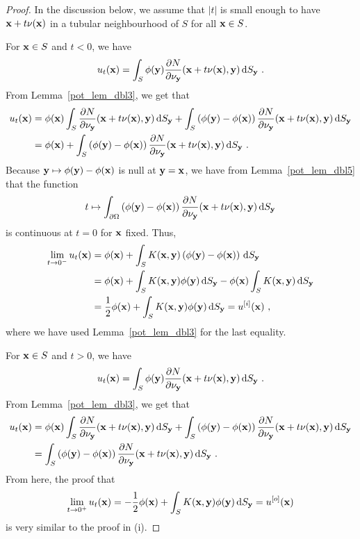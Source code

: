 \begin{proof}
In the discussion below, we assume that $|t|$ is small enough to have
$\mathbf{x} + t \mathbf{\nu}(\mathbf{x})$ in a tubular neighbourhood of $S$ for
all $\mathbf{x} \in S$.  

For $\mathbf{x} \in S$ and $t<0$, we have
\[
u_t(\mathbf{x}) = \int_S \phi(\mathbf{y})
\frac{\partial{N}}{\partial \mathbf{\nu}_{\mathbf{y}}}(\mathbf{x} +t \mathbf{\nu}(\mathbf{x}),\mathbf{y})
\,\mathrm{d}{S}_{\mathbf{y}} \ .
\]
From Lemma~\ref{pot_lem_dbl3}, we get that
\begin{align*}
u_t(\mathbf{x}) &= \phi(\mathbf{x}) \int_S \frac{\partial{N}}{\partial \mathbf{\nu}_{\mathbf{y}}}
(\mathbf{x} +t \mathbf{\nu}(\mathbf{x}),\mathbf{y}) \,\mathrm{d}{S}_{\mathbf{y}}
+ \int_S \left( \phi(\mathbf{y}) - \phi(\mathbf{x}) \right)
\frac{\partial{N}}{\partial \mathbf{\nu}_{\mathbf{y}}}(\mathbf{x} +t \mathbf{\nu}(\mathbf{x}),\mathbf{y})
\,\mathrm{d}{S}_{\mathbf{y}} \\
&= \phi(\mathbf{x}) + \int_S \left( \phi(\mathbf{y}) - \phi(\mathbf{x}) \right) 
\frac{\partial{N}}{\partial \mathbf{\nu}_{\mathbf{y}}}(\mathbf{x} +t \mathbf{\nu}(\mathbf{x}),\mathbf{y})
\,\mathrm{d}{S}_{\mathbf{y}} \ .
\end{align*}
Because $\mathbf{y} \mapsto \phi(\mathbf{y})-\phi(\mathbf{x})$ is null at
$\mathbf{y}=\mathbf{x}$, we have from Lemma~\ref{pot_lem_dbl5} that the function
\[
t \mapsto \int_{\partial \Omega}
\left( \phi(\mathbf{y}) - \phi(\mathbf{x}) \right)
\frac{\partial{N}}{\partial \mathbf{\nu}_{\mathbf{y}}}(\mathbf{x} +t \mathbf{\nu}(\mathbf{x}),\mathbf{y})
\,\mathrm{d}{S}_{\mathbf{y}}
\]
is continuous at $t=0$ for $\mathbf{x}$ fixed.  Thus,
\begin{align*}
\lim_{t\rightarrow 0^-} u_t(\mathbf{x})
&= \phi(\mathbf{x}) + \int_S K(\mathbf{x},\mathbf{y}) \left( \phi(\mathbf{y})
- \phi(\mathbf{x}) \right) \,\mathrm{d}{S}_{\mathbf{y}} \\
&= \phi(\mathbf{x}) +
\int_S K(\mathbf{x},\mathbf{y}) \phi(\mathbf{y}) \,\mathrm{d}{S}_{\mathbf{y}}
- \phi(\mathbf{x}) \int_S K(\mathbf{x},\mathbf{y}) \,\mathrm{d}{S}_{\mathbf{y}} \\
&= \frac{1}{2} \phi(\mathbf{x})
+ \int_S K(\mathbf{x},\mathbf{y}) \phi(\mathbf{y}) \,\mathrm{d}{S}_{\mathbf{y}}
= u^{[i]}(\mathbf{x}) \ ,
\end{align*}
where we have used Lemma~\ref{pot_lem_dbl3} for the last
equality.

For $\mathbf{x} \in S$ and $t>0$, we have
\[
u_t(\mathbf{x}) = \int_S \phi(\mathbf{y})
\frac{\partial{N}}{\partial \mathbf{\nu}_{\mathbf{y}}}(\mathbf{x} +t \mathbf{\nu}(\mathbf{x}),\mathbf{y})
\,\mathrm{d}{S}_{\mathbf{y}} \ .
\]
From Lemma~\ref{pot_lem_dbl3}, we get that
\begin{align*}
u_t(\mathbf{x}) &= \phi(\mathbf{x}) \int_S \frac{\partial{N}}{\partial \mathbf{\nu}_{\mathbf{y}}}
(\mathbf{x} +t \mathbf{\nu}(\mathbf{x}),\mathbf{y}) \,\mathrm{d}{S}_{\mathbf{y}}
+ \int_S \left( \phi(\mathbf{y}) - \phi(\mathbf{x}) \right)
\frac{\partial{N}}{\partial \mathbf{\nu}_{\mathbf{y}}}(\mathbf{x} +t \mathbf{\nu}(\mathbf{x}),\mathbf{y})
\,\mathrm{d}{S}_{\mathbf{y}} \\
&= \int_S \left( \phi(\mathbf{y}) - \phi(\mathbf{x}) \right) 
\frac{\partial{N}}{\partial \mathbf{\nu}_{\mathbf{y}}}(\mathbf{x} +t \mathbf{\nu}(\mathbf{x}),\mathbf{y})
\,\mathrm{d}{S}_{\mathbf{y}} \ .
\end{align*}
From here, the proof that
\[
\lim_{t\rightarrow 0^+} u_t(\mathbf{x}) = -\frac{1}{2} \phi(\mathbf{x}) +
\int_S K(\mathbf{x},\mathbf{y}) \phi(\mathbf{y}) \,\mathrm{d}{S}_{\mathbf{y}} = u^{[o]}(\mathbf{x})
\]
is very similar to the proof in (i).


\end{proof}
